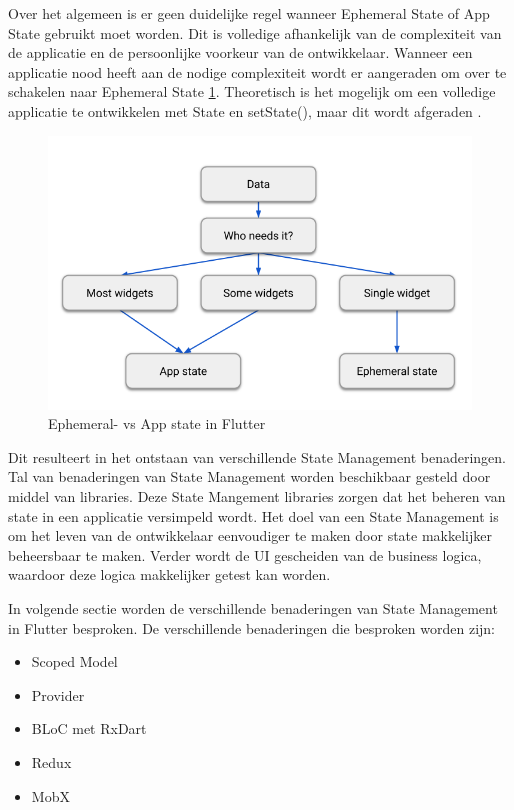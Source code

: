 Over het algemeen is er geen duidelijke regel wanneer Ephemeral State of App State gebruikt moet worden. Dit is volledige afhankelijk van de complexiteit van de applicatie en de persoonlijke voorkeur van de ontwikkelaar.
Wanneer een applicatie nood heeft aan de nodige complexiteit wordt er aangeraden om over te schakelen naar Ephemeral State \ref{fig:ephemeral-vs-app-state-flutter}. Theoretisch is het mogelijk om een volledige applicatie te ontwikkelen met State en setState(), maar dit wordt afgeraden \textcite{Developers2019}.
\begin{figure}[H]
    \includegraphics[width=\linewidth]{img/stand-van-zaken/ephemeral-vs-app-state-flutter.png}
    \caption{Ephemeral- vs App state in Flutter \autocite{Developers2019}}
    \label{fig:ephemeral-vs-app-state-flutter}
\end{figure}

Dit resulteert in het ontstaan van verschillende State Management benaderingen. Tal van benaderingen van State Management worden beschikbaar gesteld door middel van libraries. Deze State Mangement libraries zorgen dat het beheren van state in een applicatie versimpeld wordt.
Het doel van een State Management is om het leven van de ontwikkelaar eenvoudiger te
maken door state makkelijker beheersbaar te maken. Verder wordt de UI gescheiden van
de business logica, waardoor deze logica makkelijker getest kan worden.

In volgende sectie worden de verschillende benaderingen van State Management in Flutter besproken.
De verschillende benaderingen die besproken worden zijn: 
\begin{itemize}
    \item Scoped Model
    \item Provider
    \item BLoC met RxDart
    \item Redux
    \item MobX
\end{itemize}

